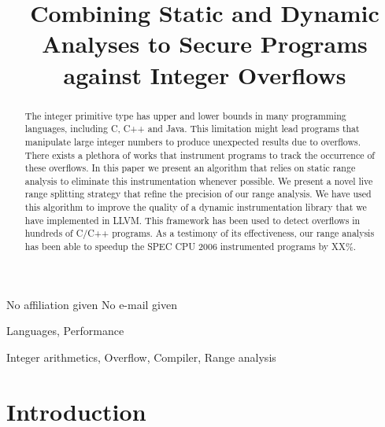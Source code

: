 \documentclass[preprint]{sigplanconf}[10pt]
\begin{document}
\copyrightdata{[to be supplied]} 


\title{Combining Static and Dynamic Analyses to Secure Programs against
Integer Overflows}

           {No affiliation given}
           {No e-mail given}

\maketitle

\begin{abstract}
The integer primitive type has upper and lower bounds in many programming
languages, including C, C++ and Java.
This limitation might lead programs that manipulate large integer numbers to
produce unexpected results due to overflows.
There exists a plethora of works that instrument programs to track the occurrence
of these overflows.
In this paper we present an algorithm that relies on static range analysis to
eliminate this instrumentation whenever possible.
We present a novel live range splitting strategy that refine the precision of
our range analysis.
We have used this algorithm to improve the quality of a dynamic instrumentation
library that we have implemented in LLVM.
This framework has been used to detect overflows in hundreds of C/C++ programs.
As a testimony of its effectiveness, our range analysis has been able to speedup
the SPEC CPU 2006 instrumented programs by XX\%.
\end{abstract}


\terms
Languages, Performance

\keywords
Integer arithmetics, Overflow, Compiler, Range analysis

\section{Introduction}
\label{sec:int}
\end{document}
